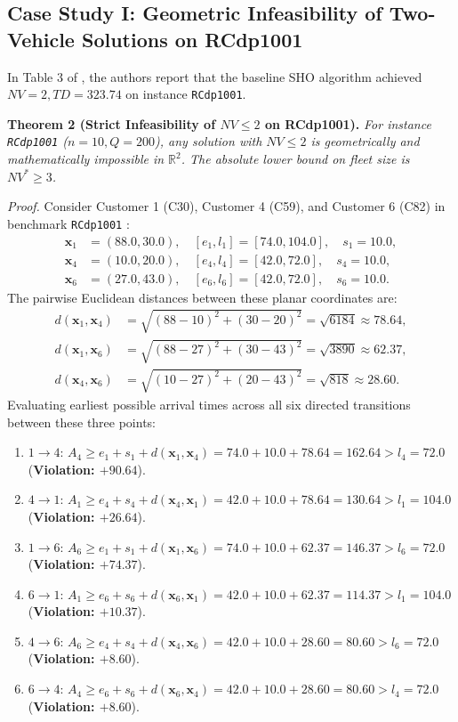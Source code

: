 \subsection{Case Study I: Geometric Infeasibility of Two-Vehicle Solutions on RCdp1001}
\label{sec:rcdp1001}
In Table 3 of \cite{nguyen2026phshowoa}, the authors report that the baseline SHO algorithm achieved $NV = 2, TD = 323.74$ on instance \texttt{RCdp1001}.

\vspace{0.25cm}
\noindent\textbf{Theorem 2 (Strict Infeasibility of $NV \le 2$ on RCdp1001).}
\textit{For instance \texttt{RCdp1001} ($n=10, Q=200$), any solution with $NV \le 2$ is geometrically and mathematically impossible in $\mathbb{R}^2$. The absolute lower bound on fleet size is $NV^* \ge 3$.}

\vspace{0.15cm}
\noindent\textit{Proof.}
Consider Customer 1 (C30), Customer 4 (C59), and Customer 6 (C82) in benchmark \texttt{RCdp1001} \citep{wang2012coevolutionary}:
\begin{align*}
\mathbf{x}_1 &= (88.0, 30.0), \quad [e_1, l_1] = [74.0, 104.0], \quad s_1 = 10.0, \\
\mathbf{x}_4 &= (10.0, 20.0), \quad [e_4, l_4] = [42.0, 72.0], \quad s_4 = 10.0, \\
\mathbf{x}_6 &= (27.0, 43.0), \quad [e_6, l_6] = [42.0, 72.0], \quad s_6 = 10.0.
\end{align*}
The pairwise Euclidean distances between these planar coordinates are:
\begin{align*}
d(\mathbf{x}_1, \mathbf{x}_4) &= \sqrt{(88 - 10)^2 + (30 - 20)^2} = \sqrt{6184} \approx 78.64, \\
d(\mathbf{x}_1, \mathbf{x}_6) &= \sqrt{(88 - 27)^2 + (30 - 43)^2} = \sqrt{3890} \approx 62.37, \\
d(\mathbf{x}_4, \mathbf{x}_6) &= \sqrt{(10 - 27)^2 + (20 - 43)^2} = \sqrt{818} \approx 28.60.
\end{align*}
Evaluating earliest possible arrival times across all six directed transitions between these three points:
\begin{enumerate}
    \item $1 \to 4$: $A_4 \ge e_1 + s_1 + d(\mathbf{x}_1, \mathbf{x}_4) = 74.0 + 10.0 + 78.64 = 162.64 > l_4 = 72.0$ (\textbf{Violation: $+90.64$}).
    \item $4 \to 1$: $A_1 \ge e_4 + s_4 + d(\mathbf{x}_4, \mathbf{x}_1) = 42.0 + 10.0 + 78.64 = 130.64 > l_1 = 104.0$ (\textbf{Violation: $+26.64$}).
    \item $1 \to 6$: $A_6 \ge e_1 + s_1 + d(\mathbf{x}_1, \mathbf{x}_6) = 74.0 + 10.0 + 62.37 = 146.37 > l_6 = 72.0$ (\textbf{Violation: $+74.37$}).
    \item $6 \to 1$: $A_1 \ge e_6 + s_6 + d(\mathbf{x}_6, \mathbf{x}_1) = 42.0 + 10.0 + 62.37 = 114.37 > l_1 = 104.0$ (\textbf{Violation: $+10.37$}).
    \item $4 \to 6$: $A_6 \ge e_4 + s_4 + d(\mathbf{x}_4, \mathbf{x}_6) = 42.0 + 10.0 + 28.60 = 80.60 > l_6 = 72.0$ (\textbf{Violation: $+8.60$}).
    \item $6 \to 4$: $A_4 \ge e_6 + s_6 + d(\mathbf{x}_6, \mathbf{x}_4) = 42.0 + 10.0 + 28.60 = 80.60 > l_4 = 72.0$ (\textbf{Violation: $+8.60$}).
\end{enumerate}
